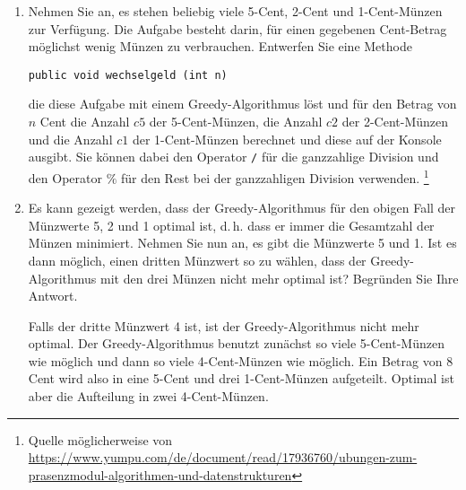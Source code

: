 \documentclass{lehramt-informatik-haupt}
\begin{document}
\begin{enumerate}


\item Nehmen Sie an, es stehen beliebig viele 5-Cent, 2-Cent und
1-Cent-Münzen zur Verfügung. Die Aufgabe besteht darin, für einen
gegebenen Cent-Betrag möglichst wenig Münzen zu verbrauchen. Entwerfen
Sie eine Methode

\begin{verbatim}
public void wechselgeld (int n)
\end{verbatim}

die diese Aufgabe mit einem Greedy-Algorithmus löst und für den Betrag
von $n$ Cent die Anzahl $c5$ der 5-Cent-Münzen, die Anzahl $c2$ der
2-Cent-Münzen und die Anzahl $c1$ der 1-Cent-Münzen berechnet und diese
auf der Konsole ausgibt. Sie können dabei den Operator \texttt{/} für
die ganzzahlige Division und den Operator $\%$ für den Rest bei der
ganzzahligen Division verwenden.
\footnote{Quelle möglicherweise von \url{https://www.yumpu.com/de/document/read/17936760/ubungen-zum-prasenzmodul-algorithmen-und-datenstrukturen}}

\begin{antwort}
\end{antwort}


\item Es kann gezeigt werden, dass der Greedy-Algorithmus für den obigen
Fall der Münzwerte 5, 2 und 1 optimal ist, d.\,h. dass er immer die
Gesamtzahl der Münzen minimiert. Nehmen Sie nun an, es gibt die
Münzwerte 5 und 1. Ist es dann möglich, einen dritten Münzwert so zu
wählen, dass der Greedy-Algorithmus mit den drei Münzen nicht mehr
optimal ist? Begründen Sie Ihre Antwort.

\begin{antwort}
Falls der dritte Münzwert 4 ist, ist der Greedy-Algorithmus nicht mehr
optimal. Der Greedy-Algorithmus benutzt zunächst so viele 5-Cent-Münzen
wie möglich und dann so viele 4-Cent-Münzen wie möglich. Ein Betrag von
8 Cent wird also in eine 5-Cent und drei 1-Cent-Münzen aufgeteilt.
Optimal ist aber die Aufteilung in zwei 4-Cent-Münzen.
\end{antwort}
\end{enumerate}

%
\end{document}
